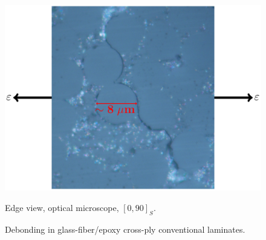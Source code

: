 \begin{figure}[!h]
\centering
        \includegraphics[width=\textwidth]{pics/transversecracks-micro.pdf}
       \caption{Edge view, optical microscope, $\left[0,90\right]_{S}$.}
\caption{Debonding in glass-fiber/epoxy cross-ply conventional laminates.}\label{intro:fig:debonding}
\end{figure}

